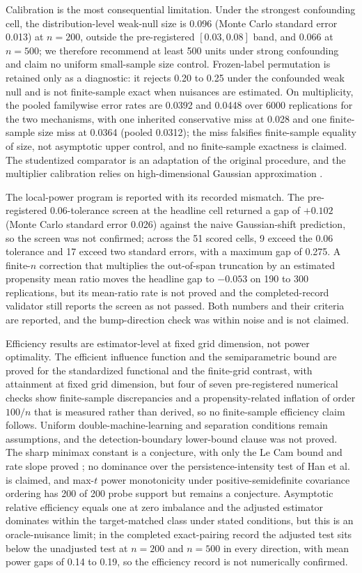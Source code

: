 Calibration is the most consequential limitation. Under the strongest confounding cell, the distribution-level weak-null size is 0.096 (Monte Carlo standard error 0.013) at $n=200$, outside the pre-registered $[0.03,0.08]$ band, and 0.066 at $n=500$; we therefore recommend at least 500 units under strong confounding and claim no uniform small-sample size control. Frozen-label permutation is retained only as a diagnostic: it rejects 0.20 to 0.25 under the confounded weak null \cite{chung_romano_2013} and is not finite-sample exact when nuisances are estimated. On multiplicity, the pooled familywise error rates are 0.0392 and 0.0448 over 6000 replications for the two mechanisms, with one inherited conservative miss at 0.028 and one finite-sample size miss at 0.0364 (pooled 0.0312); the miss falsifies finite-sample equality of size, not asymptotic upper control, and no finite-sample exactness is claimed. The studentized comparator is an adaptation of the original procedure, and the multiplier calibration relies on high-dimensional Gaussian approximation \cite{cck_2013}.

The local-power program is reported with its recorded mismatch. The pre-registered 0.06-tolerance screen at the headline cell returned a gap of $+0.102$ (Monte Carlo standard error 0.026) against the naive Gaussian-shift prediction, so the screen was not confirmed; across the 51 scored cells, 9 exceed the 0.06 tolerance and 17 exceed two standard errors, with a maximum gap of 0.275. A finite-$n$ correction that multiplies the out-of-span truncation by an estimated propensity mean ratio moves the headline gap to $-0.053$ on 190 to 300 replications, but its mean-ratio rate is not proved and the completed-record validator still reports the screen as not passed. Both numbers and their criteria are reported, and the bump-direction check was within noise and is not claimed.

Efficiency results are estimator-level at fixed grid dimension, not power optimality. The efficient influence function and the semiparametric bound are proved for the standardized functional and the finite-grid contrast, with attainment at fixed grid dimension, but four of seven pre-registered numerical checks show finite-sample discrepancies and a propensity-related inflation of order $100/n$ that is measured rather than derived, so no finite-sample efficiency claim follows. Uniform double-machine-learning and separation conditions remain assumptions, and the detection-boundary lower-bound clause was not proved. The sharp minimax constant is a conjecture, with only the Le Cam bound and rate slope proved \cite{le_cam_1986,ingster_1993}; no dominance over the persistence-intensity test of Han et al. \cite{han_kim_kim_2026} is claimed, and max-$t$ power monotonicity under positive-semidefinite covariance ordering has 200 of 200 probe support but remains a conjecture. Asymptotic relative efficiency equals one at zero imbalance and the adjusted estimator dominates within the target-matched class under stated conditions, but this is an oracle-nuisance limit; in the completed exact-pairing record the adjusted test sits below the unadjusted test at $n=200$ and $n=500$ in every direction, with mean power gaps of 0.14 to 0.19, so the efficiency record is not numerically confirmed.

